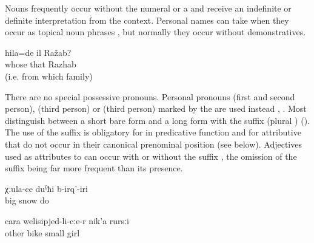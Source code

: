 Nouns frequently occur without the numeral  or a  and receive an indefinite or definite interpretation from the context. Personal names can take  when they occur as topical noun phrases , but normally they occur without demonstratives.
%
\begin{exe}
	\ex	\label{ex:Whose was that Razhab@3}
	\gll	hila=de	il	Ražab?\\
		whose	that	Razhab\\
	\glt	{} (i.e. from which family)
\end{exe}

There are no special possessive pronouns. Personal pronouns (first and second person),  (third person) or  (third person) marked by the  are used instead , . Most  distinguish between a short bare form and a long form with the suffix  (plural ) (). The use of the suffix is obligatory for  in predicative function and for attributive  that do not occur in their canonical prenominal position (see  below). Adjectives used as attributes to  can occur with  or without the suffix , the omission of the suffix being far more frequent than its presence.
%
\begin{exe}

		\ex	\label{ex:It snowed a lot@4a}
		\gll	χːula-ce	duˁħi	b-irq'-iri\\
			big	snow	do\\
		\glt	{}
	
		\ex	\label{ex:another little girl on a bike@4b}
		\gll	cara	welisipjed-li-cːe-r	nik'a	rursːi\\
			other	bike	small	girl\\
		\glt	{}

\end{exe}

